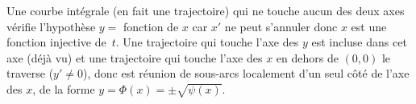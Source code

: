 {\begin{enumerate}
{Une courbe intégrale (en fait une trajectoire) qui
ne touche aucun des deux axes vérifie l'hypothèse $y = $
fonction de $x$ car $x'$ ne peut s'annuler donc $x$ est une fonction
injective de~$t$. Une trajectoire qui touche l'axe des $y$ est incluse
dans cet axe (déjà vu) et une trajectoire qui touche l'axe des $x$ en
dehors de $(0,0)$ le traverse ($y' \ne 0$), donc est réunion de
sous-arcs localement d'un seul côté de l'axe des $x$,
de la forme $y = \Phi(x)=\pm\sqrt{\psi(x)}$.}
\end{enumerate}
}
